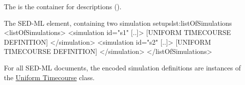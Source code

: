 \label{sec:listOfSimulations}

The  is the container for  descriptions ().
%
%

%
\begin{myXmlLst}{The SED-ML  element, containing two simulation setups}{lst:listOfSimulations}
 <listOfSimulations>
  <simulation id="s1" [..]>
   [UNIFORM TIMECOURSE DEFINITION]
  </simulation>
  <simulation id="s2" [..]>
   [UNIFORM TIMECOURSE DEFINITION]
  </simulation>
 </listOfSimulations>
\end{myXmlLst}
%
For all SED-ML \LoneVone documents, the encoded simulation definitions are instances of the \hyperref[class:timeCourse]{Uniform Timecourse} class.


